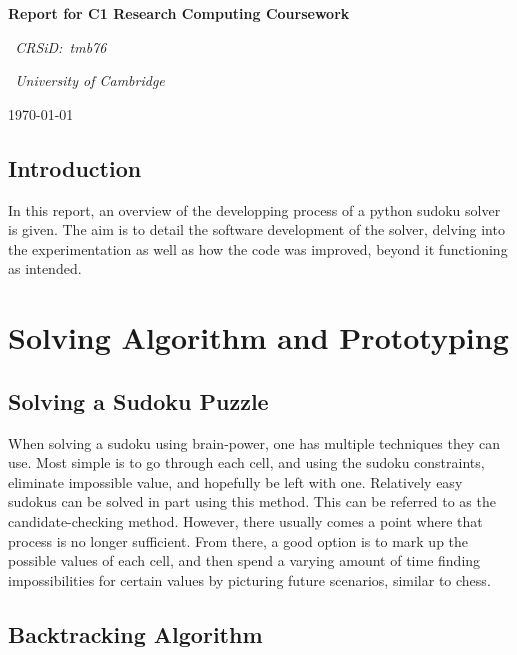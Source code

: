 \documentclass[12pt]{report} %
\begin{document}
\begin{titlepage}
  \centering
  \vspace*{2cm}
  {\LARGE\bfseries Report for C1 Research Computing Coursework\par}
  \vspace{1cm}
  {\Large\itshape\ CRSiD:\ tmb76\par}
  \vspace{1cm}
  {\Large\itshape\ University of Cambridge\par}
  \vfill
  {\large\today\par}
\end{titlepage}

\tableofcontents

\newpage
\vspace*{13\baselineskip}
\section*{Introduction}

In this report, an overview of the developping process of a python sudoku solver is given. The aim is to detail the software development of the solver, delving into the experimentation as well as how the code was improved, beyond it functioning as intended.

\chapter{Solving Algorithm and Prototyping}

\section{Solving a Sudoku Puzzle}

When solving a sudoku using brain-power, one has multiple techniques they can use. Most simple is to go through each cell, and using the sudoku constraints, eliminate impossible value, and hopefully be left with one. Relatively easy sudokus can be solved in part using this method. This can be referred to as the candidate-checking method\cite{cornell_sudoku}.
However, there usually comes a point where that process is no longer sufficient. From there, a good option is to mark up the possible values of each cell, and then spend a varying amount of time finding impossibilities for certain values by picturing future scenarios, similar to chess\cite{cornell_sudoku}.

\newpage
\section{Backtracking Algorithm}
\end{document}
